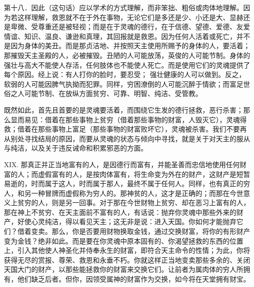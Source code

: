 第十八．因此（这句话）应以学术的方式理解，而非笨拙、粗俗或肉体地理解。因为若这样理解，救恩就不在于外在事物，无论它们是多还是少、小还是大、显赫还是卑微、受尊重还是被轻视；而是在于灵魂的德行，在于信德、望德、爱德、友爱情谊、知识、温良、谦逊和真理，其回报就是救恩。因为任何人活着或死亡，并不是因为身体的美丑。而是那贞洁地、并按照天主使用所赐予的身体的人，要活着；那摧毁天主圣殿的人，必被摧毁。丑陋的人可能放荡，英俊的人可能节制。身体的强壮与高大不能使人存活，任何肢体也不能使人死亡。而是使用它们的灵魂提供了每个原因。经上说：有人打你的脸时，要忍受； 强壮健康的人可以做到。反之，软弱的人可能因脾气执拗而犯罪。同样，穷困潦倒的人可能沉醉于情欲；而富足世俗之人可能节制、在放纵方面贫穷、可靠、明智、纯洁、受管教。\par

既然如此，首先且首要的是灵魂要活着，而围绕它生发的德行拯救，恶行杀害；那么显而易见：借着在那些事物上贫穷（借着那些事物的财富，人毁灭它），灵魂得救；借着在那些事物上富足（那些事物的财富败坏它），灵魂被杀害。我们不要再从别处寻找结局的原因，而要从灵魂的状态与倾向中寻找，就是关于对天主的服从与纯洁，以及关于违反诫命和积累邪恶的方面。\par

XIX. 那真正并正当地富有的人，是因德行而富有，并能圣善而忠信地使用任何财富的人；而虚假富有的人，是按肉体富有，将生命变为外在的财产，这财产是短暂易逝的，时而属于这人，时而属于那人，最终不属于任何人。同样，也有真正的穷人，和另一种冒牌而虚假称为穷人的。那神贫的人，这才是正确的；而那在今世意义上贫穷的人，则是另一回事。对于那在今世财物上贫穷、却在恶习上富有的人，那在神上不贫穷、在天主面前不富有的人，有话说：抛弃你灵魂中那些外来的财产，好使心灵纯洁，得以看见天主；这无非是说：进入天国。你如何才能抛弃它们？借着变卖。那么，你是否要用财物换取金钱，通过交换财富，将你的有形财产变为金钱？绝非如此。而是要在你灵魂中原本固有的、你渴望拯救的东西的位置上，引入其他使人神圣化并侍奉永生的财富，即符合天主命令的性情；为此，你将获得无尽的赏报、尊荣、救恩和永垂不朽。你就这样正当地变卖那些多余的、关闭天国大门的财产，以那些能拯救你的财富来交换它们。让前者为属肉体的穷人所拥有，他们缺乏后者。但你，因领受属神的财富作为交换，如今将在天堂拥有财宝。\par


